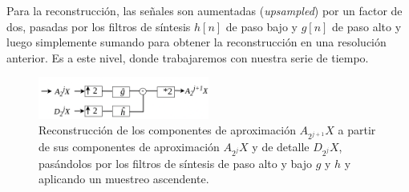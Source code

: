 Para la reconstrucción, las señales son aumentadas (\textit{upsampled}) por un factor de dos, pasadas por los filtros de síntesis $h[n]$ de paso bajo y $g[n]$ de paso alto y luego simplemente sumando para obtener la reconstrucción en una resolución anterior. Es a este nivel, donde trabajaremos con nuestra serie de tiempo.

\begin{figure}[H]
    \centering
    \includegraphics[width=0.5\textwidth]{Figuras/descomposicion/Recomposition_DWT.png}
    \caption{Reconstrucción de los componentes de aproximación $A_{2^{j+1}}X$ a partir de sus componentes de aproximación $A_{2^{j}}X$ y de detalle $D_{2^{j}}X$, pasándolos por los filtros de síntesis de paso alto y bajo $g$ y $h$ y aplicando un muestreo ascendente.}
    \label{fig:reconstruccion_DWT}
\end{figure}





